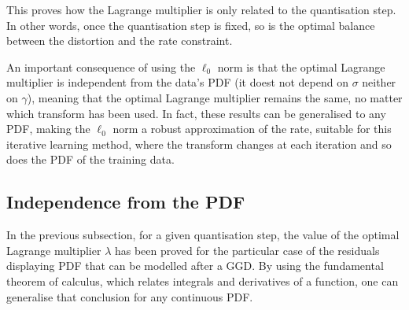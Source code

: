 \documentclass[11pt,a4paper,openright,twoside]{book}
\numberwithin{equation}{section} %
\numberwithin{figure}{section} %
\numberwithin{table}{section} %
\begin{document}
This proves how the Lagrange multiplier is only related to the
quantisation step.
In other words, once the quantisation step is fixed, so is the optimal
balance between the distortion and the rate constraint.

An important consequence of using the $\ell_0$ norm is that the optimal
Lagrange multiplier is independent from the data's \ac{PDF} (it doest
not depend on $\sigma$ neither on $\gamma$), meaning that the optimal
Lagrange multiplier remains the same, no matter which transform has been
used.
In fact, these results can be generalised to any \ac{PDF}, making the
$\ell_0$ norm a robust approximation of the rate, suitable for this
iterative learning method, where the transform changes at each iteration
and so does the \ac{PDF} of the training data.

\subsection{Independence from the \ac{PDF}}
\label{sub:independence_from_the_pdf}

In the previous subsection, for a given quantisation step, the value of
the optimal Lagrange multiplier $\lambda$ has been proved for the
particular case of the residuals displaying \ac{PDF} that can be
modelled after a \ac{GGD}.
By using the fundamental theorem of calculus, which relates integrals
and derivatives of a function, one can generalise that conclusion for
any continuous \ac{PDF}.
\end{document}
